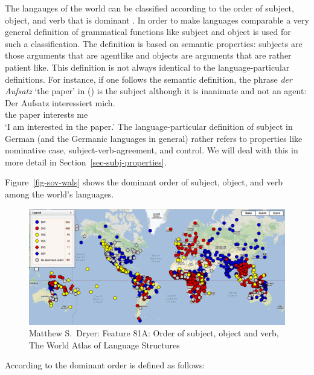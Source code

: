 The langauges of the world can be classified according to the order of subject, object, and verb
that is dominant \citep{Greenberg63a-u}. In order to make languages comparable a very general definition of grammatical
functions like subject and object is used
for such a classification. The definition is based on semantic properties: subjects are those
arguments that are agentlike and objects are arguments that are rather patient like. This definition
is not always identical to the language-particular definitions. For instance, if one follows the
semantic definition, the phrase \emph{der
  Aufsatz} `the paper' in () is the subject although it is inanimate and not an agent: 
\ea
\gll Der Aufsatz interessiert mich.\\
     the paper   interests    me\\
\glt `I am interested in the paper.'
\z
The language-particular definition of subject in German (and the Germanic languages in general)
rather refers to properties like nominative case, subject-verb-agreement, and control. We will deal with this in more
detail in Section~\ref{sec-subj-properties}.

Figure~\vref{fig-sov-wals} shows the dominant order of subject, object, and verb among the world's languages.
\begin{figure}[htbp]
\includegraphics[width=\textwidth]{Pictures/WALS-SOV}
\caption{\label{fig-sov-wals}Matthew S.\ Dryer: Feature 81A: Order of subject, object and verb, The World Atlas of Language Structures} 
\end{figure}
According to \citet{Dryer2013a} the dominant order is defined as follows:

